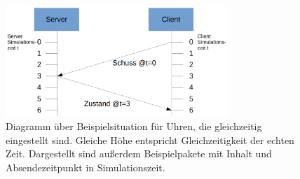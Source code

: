 \begin{figure}
    \centering
    \includegraphics[width=0.75\textwidth]{./Zeichnung1a.png}
    \caption{Diagramm über Beispielsituation für Uhren, die gleichzeitig eingestellt sind. Gleiche Höhe entspricht Gleichzeitigkeit der echten Zeit. Dargestellt sind außerdem Beispielpakete mit Inhalt und Absendezeitpunkt in Simulationszeit.}
    \label{fig:zeichnung1a}
\end{figure}

